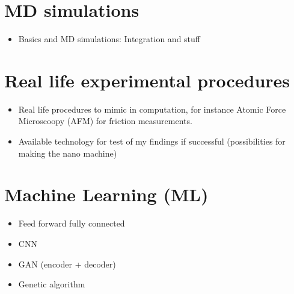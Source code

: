 \section{MD simulations}
\begin{itemize}
  \item Basics and MD simulations: Integration and stuff
\end{itemize}
\section{Real life experimental procedures}
\begin{itemize}
  \item Real life procedures to mimic in computation, for instance Atomic Force Microscoopy (AFM) for friction measurements.
  \item Available technology for test of my findings if successful (possibilities for making the nano machine) 
\end{itemize}
\section{Machine Learning (ML)}
\begin{itemize}
  \item Feed forward fully connected
  \item CNN
  \item GAN (encoder + decoder)
  \item Genetic algorithm
\end{itemize}

